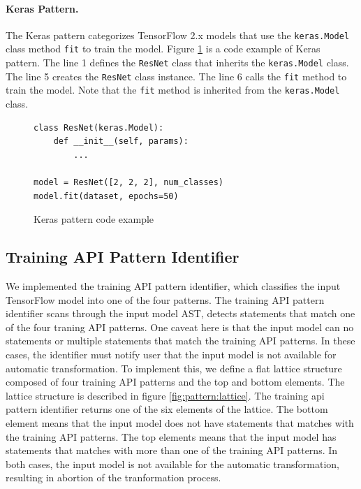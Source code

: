 \paragraph{Keras Pattern.}
The Keras pattern categorizes TensorFlow 2.x models that use
the {\tt keras.Model} class method {\tt fit} to train the model. 
Figure \ref{fig:keraspattern} is a code example of Keras pattern.
The line 1 defines the {\tt ResNet} class that inherits the 
{\tt keras.Model} class. 
The line 5 creates the {\tt ResNet} class instance.
The line 6 calls the {\tt fit} method to train the model.
Note that the {\tt fit} method is inherited from the {\tt keras.Model} class.

\begin{figure}[ht!]
  \begin{lstlisting}[style=mpython]
class ResNet(keras.Model):
    def __init__(self, params):
        ...

model = ResNet([2, 2, 2], num_classes)
model.fit(dataset, epochs=50)\end{lstlisting}
 
  \caption{Keras pattern code example}
  \label{fig:keraspattern}
\end{figure}


\subsection{Training API Pattern Identifier}\label{sec:ident}

We implemented the training API pattern identifier, which classifies the
input TensorFlow model into one of the four patterns.
The training API pattern identifier scans through the input model AST,
detects statements that match one of the four traning API patterns.
One caveat here is that the input model can no statements or multiple statements
that match the training API patterns.
In these cases, the identifier must notify user that the
input model is not available for automatic transformation.
To implement this, we define a flat lattice structure composed of four 
training API patterns and the top and bottom elements.
The lattice structure is described in figure \ref{fig:pattern:lattice}.
The training api pattern identifier returns one of the six elements of
the lattice. The bottom element means that the input model does not have
statements that matches with the training API patterns.
The top elements means that the input model has statements that matches with
more than one of the training API patterns.
In both cases, the input model is not available for the automatic 
transformation, resulting in abortion of the tranformation process.

